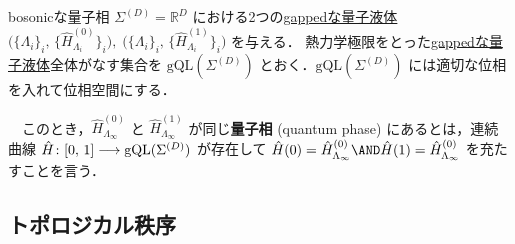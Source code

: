 \documentclass[TQFT_main]{subfiles}
\begin{document}
\begin{mydefph}[label=def:quantum-phase]{bosonicな量子相}
    $\Sigma^{(D)} = \mathbb{R}^{D}$ における2つの\hyperref[def:gappedQL]{gappedな量子液体} $\bigl( \{\Lambda_i\}_i,\, \{\hat{H}^{(0)}_{\Lambda_i}\}_i \bigr),\; \bigl( \{\Lambda_i\}_i,\, \{\hat{H}^{(1)}_{\Lambda_i}\}_i \bigr)$ を与える．
    熱力学極限をとった\hyperref[def:gappedQL]{gappedな量子液体}全体がなす集合を $\mathrm{gQL}(\Sigma^{(D)})$ とおく．$\mathrm{gQL}(\Sigma^{(D)})$ には適切な位相を入れて位相空間にする．

    　このとき，$\hat{H}^{(0)}_{\Lambda_\infty}$ と $\hat{H}^{(1)}_{\Lambda_\infty}$ が同じ\textbf{量子相} (quantum phase) にあるとは，連続曲線 $\hat{H} \colon [0,\, 1] \longrightarrow \mathrm{gQL}(\Sigma^{(D)})$ が存在して
    $\hat{H}(0) = \hat{H}^{(0)}_{\Lambda_\infty} \AND \hat{H}(1) = \hat{H}^{(0)}_{\Lambda_\infty}$ を充たすことを言う．
\end{mydefph}



\subsection{トポロジカル秩序}


    

\end{document}
